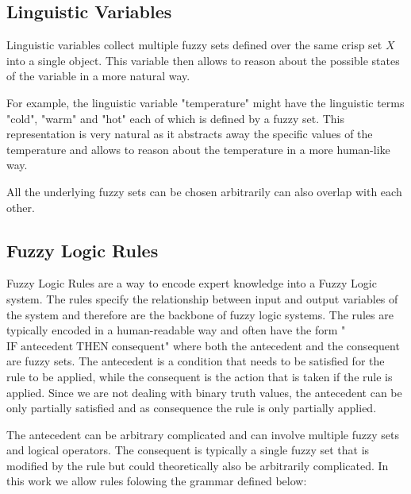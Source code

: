 
\subsection{Linguistic Variables}

Linguistic variables collect multiple fuzzy sets defined over the same crisp set $X$ into a single object. This variable then allows to reason about the possible states of the variable in a more natural way.

For example, the linguistic variable "temperature" might have the linguistic terms "cold", "warm" and "hot" each of which is defined by a fuzzy set. This representation is very natural as it abstracts away the specific values of the temperature and allows to reason about the temperature in a more human-like way.

All the underlying fuzzy sets can be chosen arbitrarily can also overlap with each other.


\subsection{Fuzzy Logic Rules}

Fuzzy Logic Rules are a way to encode expert knowledge into a Fuzzy Logic system. The rules specify the relationship between input and output variables of the system and therefore are the backbone of fuzzy logic systems.
The rules are typically encoded in a human-readable way and often have the form "$\text{IF} \; \text{antecedent} \; \text{THEN} \; \text{consequent}$" where both the antecedent and the consequent are fuzzy sets. The antecedent is a condition that needs to be satisfied for the rule to be applied, while the consequent is the action that is taken if the rule is applied. Since we are not dealing with binary truth values, the antecedent can be only partially satisfied and as consequence the rule is only partially applied.

The antecedent can be arbitrary complicated and can involve multiple fuzzy sets and logical operators. The consequent is typically a single fuzzy set that is modified by the rule but could theoretically also be arbitrarily complicated. In this work we allow rules folowing the grammar defined below:

\newcommand{\fuzzyset}{\langle \text{fuzzy set} \rangle}


